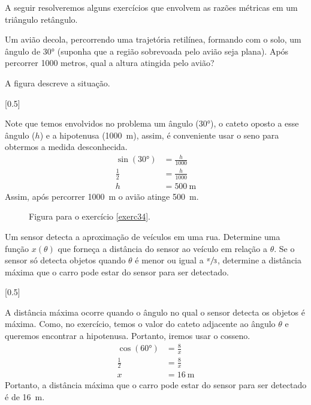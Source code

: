 A seguir resolveremos alguns exercícios que envolvem as razões métricas em um
triângulo retângulo.

\begin{example} \label{trigon1ex}
  Um avião decola, percorrendo uma trajetória retilínea, formando com o solo,
  um ângulo de \ang{30} (suponha que a região sobrevoada pelo avião seja
  plana). Após percorrer 1000 metros, qual a altura atingida pelo avião?

  \solution
  A figura descreve a situação.

  [0.5]

  Note que temos envolvidos no problema um ângulo (\ang{30}), o cateto
  oposto a esse ângulo ($h$) e a hipotenusa (\SI{1000}{\meter}), assim,
  é conveniente usar o seno para obtermos a medida desconhecida.
  \begin{align*}
    \sin(\ang{30}) & = \frac{h}{1000}   \\
    \frac{1}{2}    & = \frac{h}{1000}   \\
    h              & = \SI{500}{\meter}
  \end{align*}
  Assim, após percorrer \SI{1000}{\meter} o avião atinge \SI{500}{\meter}.
\end{example}

\begin{figure}
  \centering
  \caption{Figura para o exercício \ref{exerc34}.}
\end{figure}

\begin{example} \label{exerc34}
  Um sensor detecta a aproximação de veículos em uma rua. Determine uma função
  $x(\theta)$ que forneça a distância do sensor ao veículo em relação a
  $\theta$. Se o sensor só detecta objetos quando $\theta$ é menor ou igual a
  $\sfrac{\pi}{3}$,
  determine a distância máxima que o carro pode estar do sensor para
  ser detectado.

  \solution
  [0.5]

  A distância máxima ocorre quando o ângulo no qual o sensor detecta os objetos
  é máxima. Como, no exercício, temos o valor do cateto adjacente ao ângulo
  $\theta$ e queremos encontrar a hipotenusa. Portanto, iremos usar o cosseno.
  \begin{align*}
    \cos(\ang{60}) & = \frac{8}{x}     \\[2mm]
    \frac{1}{2}    & = \frac{8}{x}     \\[2mm]
    x              & = \SI{16}{\meter}
  \end{align*}
  Portanto, a distância máxima que o carro pode estar do sensor para ser
  detectado é de \SI{16}{\meter}.
\end{example}
